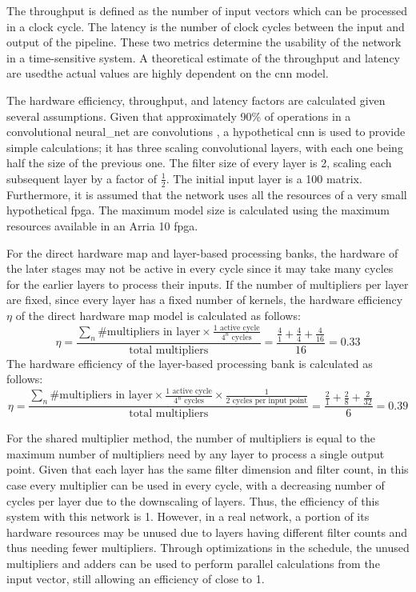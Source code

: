\documentclass{uw-ece-wkrpt}
\begin{document}
The throughput is defined as the number of input vectors which can be processed in a clock cycle. The latency is the number of clock cycles between the input and output of the pipeline. These two metrics determine the usability of the network in a time-sensitive system. A theoretical estimate of the throughput and latency are used\textemdash{}the actual values are highly dependent on the \gls{cnn} model.

The hardware efficiency, throughput, and latency factors are calculated given several assumptions. Given that approximately 90\% of operations in a convolutional \gls{neural_net} are convolutions \cite{Cong2014Minimizing-Comp}, a hypothetical \gls{cnn} is used to provide simple calculations; it has three scaling convolutional layers, with each one being half the size of the previous one. The \gls{filter} size of every layer is 2, scaling each subsequent layer by a factor of $\frac{1}{2}$. The initial input layer is a 100 matrix. Furthermore, it is assumed that the network uses all the resources of a very small hypothetical \gls{fpga}. The maximum model size is calculated using the maximum resources available in an Arria 10 \gls{fpga}.

For the direct hardware map and layer-based processing banks, the hardware of the later stages may not be active in every cycle since it may take many cycles for the earlier layers to process their inputs. If the number of multipliers per layer are fixed, since every layer has a fixed number of kernels, the hardware efficiency $\eta$ of the direct hardware map model is calculated as follows:
\begin{equation}
    \eta = \frac{\sum_n \text{\# multipliers in layer} \times \frac{1 \text{ active cycle}}{4^n \text{ cycles}}}{\text{total multipliers}} = \frac{\frac{4}{1} + \frac{4}{4} + \frac{4}{16}}{16} = 0.33
\end{equation}
The hardware efficiency of the layer-based processing bank is calculated as follows:
\begin{equation}
    \eta = \frac{\sum_n \text{\# multipliers in layer} \times \frac{1 \text{ active cycle}}{4^n  \text{ cycles}} \times \frac{1}{2 \text{ cycles per input point}}}{\text{total multipliers}} = \frac{\frac{2}{1} + \frac{2}{8} + \frac{2}{32}}{6} = 0.39
\end{equation}

For the shared multiplier method, the number of multipliers is equal to the maximum number of multipliers need by any layer to process a single output point. Given that each layer has the same \gls{filter} dimension and \gls{filter} count, in this case every multiplier can be used in every cycle, with a decreasing number of cycles per layer due to the downscaling of layers. Thus, the efficiency of this system with this network is 1. However, in a real network, a portion of its hardware resources may be unused due to layers having different \gls{filter} counts and thus needing fewer multipliers. Through optimizations in the schedule, the unused multipliers and adders can be used to perform parallel calculations from the input vector, still allowing an efficiency of close to 1.
\end{document}
